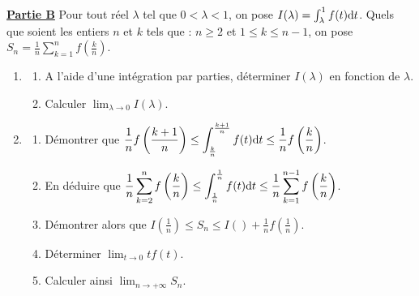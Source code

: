             
      \underline{\textbf{Partie B}} \newline
            Pour tout r\'eel $\lambda$ tel que $0 < \lambda < 1$, on pose $I(\lambda) = \int_{\lambda}^{1} f(t) \mathrm{d}t$.
            Quels que soient les entiers $n$ et $k$ tels que : $n \geq 2$ et $1 \leq k \leq n-1$, on pose
            $\displaystyle{S_n = \frac{1}{n} \sum_{k=1}^{n} f\left( \frac{k}{n} \right)}$.
            \begin{enumerate}
                  \item \begin{enumerate}
                              \item A l'aide d'une int\'egration par parties, d\'eterminer $I(\lambda)$ en fonction de $\lambda$.
                              \item Calculer $\displaystyle{\lim_{\lambda \rightarrow 0} I(\lambda)}$.
                        \end{enumerate}
                  \item \begin{enumerate}
                              \item D\'emontrer que 
                                    $\displaystyle{ 
                                                     \frac{1}{n} f\left( \frac{k+1}{n} \right) 
                                                           \leq 
                                                     \int_{\frac{k}{n}}^{\frac{k+1}{n}} f(t) \mathrm{d}t\leq 
                                                     \frac{1}{n} f\left( \frac{k}{n} \right)
                                                       }$.
                              \item En d\'eduire que
                                    $\displaystyle{
                                                     \frac{1}{n} \sum_{k=2}^{n} f\left( \frac{k}{n} \right) 
                                                           \leq 
                                                     \int_{\frac{1}{n}}^{\frac{1}{n}} f(t) \mathrm{d}t\leq 
                                                     \frac{1}{n} \sum_{k=1}^{n-1} f\left( \frac{k}{n} \right)
                                                       }$.
                              \item D\'emontrer alors que 
                                    $\displaystyle{
                                                     I\left( \frac{1}{n} \right)
                                                           \leq 
                                                     S_n
                                                           \leq 
                                                     I\left( \right) + \frac{1}{n} f\left(\frac{1}{n}\right)
                                                       }$.
                              \item D\'eterminer $\displaystyle{\lim_{t\rightarrow0} t f(t)}$.
                              \item Calculer ainsi $\displaystyle{\lim_{n\rightarrow+\infty} S_n}$.
                        \end{enumerate}
            \end{enumerate}
